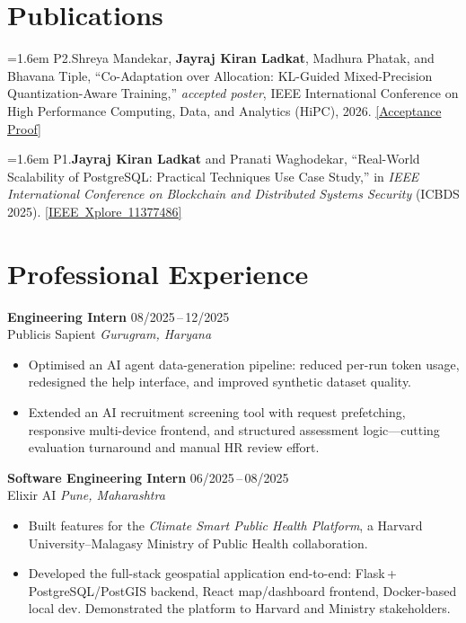 \documentclass[11pt,a4paper]{article}
\begin{document}
\section{Publications}

\hangindent=1.6em
P2.\quad Shreya Mandekar, \textbf{Jayraj Kiran Ladkat}, Madhura Phatak,
and Bhavana Tiple,
``Co-Adaptation over Allocation: KL-Guided Mixed-Precision
Quantization-Aware Training,''
\textit{accepted poster},
IEEE International Conference on High Performance Computing,
Data, and Analytics (HiPC), 2026.
\href{https://drive.google.com/file/d/1wYned37BXW-kTc7B7jNQFcwUzh66sxkG/view?usp=sharing}{[\;Acceptance Proof]}

\vspace{0.45em}

\hangindent=1.6em
P1.\quad \textbf{Jayraj Kiran Ladkat} and Pranati Waghodekar,
``Real-World Scalability of PostgreSQL: Practical Techniques
Use Case Study,''
in \textit{IEEE International Conference on Blockchain and
Distributed Systems Security} (ICBDS 2025).
\href{https://ieeexplore.ieee.org/document/11377486/}{[\;IEEE~Xplore~11377486]}


\section{Professional Experience}

\textbf{Engineering Intern} \hfill 08/2025\,--\,12/2025\\
Publicis Sapient \hfill \textit{Gurugram, Haryana}
\begin{itemize}
  \item Optimised an AI agent data-generation pipeline: reduced per-run
        token usage, redesigned the help interface, and improved synthetic
        dataset quality.
  \item Extended an AI recruitment screening tool with request
        prefetching, responsive multi-device frontend, and structured
        assessment logic---cutting evaluation turnaround and manual HR
        review effort.
\end{itemize}

\vspace{0.4em}

\textbf{Software Engineering Intern} \hfill 06/2025\,--\,08/2025\\
Elixir AI \hfill \textit{Pune, Maharashtra}
\begin{itemize}
  \item Built features for the \textit{Climate Smart Public Health
        Platform}, a Harvard University--Malagasy Ministry of Public
        Health collaboration.
  \item Developed the full-stack geospatial application end-to-end:
        Flask\,+\,PostgreSQL/PostGIS backend, React map/dashboard
        frontend, Docker-based local dev.
        Demonstrated the platform to Harvard and Ministry stakeholders.
\end{itemize}
\end{document}
